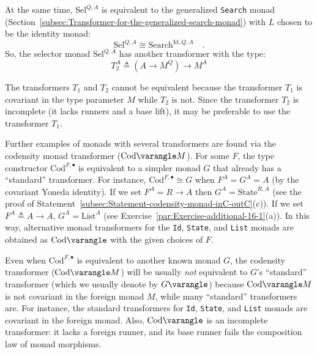 At the same time, $\text{Sel}^{Q,A}$ is equivalent to the generalized
\lstinline!Search! monad (Section~\ref{subsec:Transformer-for-the-generalized-search-monad})
with $L$ chosen to be the identity monad:
\[
\text{Sel}^{Q,A}\cong\text{Search}^{\text{Id},Q,A}\quad.
\]
So, the selector monad $\text{Sel}^{Q,A}$ has another transformer
with the type: 
\[
T_{2}^{A}\triangleq(A\rightarrow M^{Q})\rightarrow M^{A}
\]

The transformers $T_{1}$ and $T_{2}$ cannot be equivalent because
the transformer $T_{1}$ is covariant in the type parameter $M$ while
$T_{2}$ is not. Since the transformer $T_{2}$ is incomplete (it
lacks runners and a base lift), it may be preferable to use the transformer
$T_{1}$.

Further examples of monads with several transformers are found via
the codensity monad transformer ($\text{Cod}\varangle M$). For some
$F$, the type constructor $\text{Cod}^{F,\bullet}$ is equivalent
to a simpler monad $G$ that already has a \textsf{``}standard\textsf{''} transformer.
For instance, $\text{Cod}^{F,\bullet}\cong G$ when $F^{A}=G^{A}=A$
(by the covariant Yoneda identity). If we set $F^{A}=R\rightarrow A$
then $G^{A}=\text{State}^{R,A}$ (see the proof of Statement~\ref{subsec:Statement-codensity-monad-inC-outC}(c)).
If we set $F^{A}\triangleq A\rightarrow A$, $G^{A}=\text{List}^{A}$
(see Exercise~\ref{par:Exercise-additional-16-1}(a)). In this way,
alternative monad transformers for the \lstinline!Id!, \lstinline!State!,
and \lstinline!List! monads are obtained as $\text{Cod}\varangle$
with the given choices of $F$. 

Even when $\text{Cod}^{F,\bullet}$ is equivalent to another known
monad $G$, the codensity transformer ($\text{Cod}\varangle M$) will
be usually \emph{not} equivalent to $G$\textsf{'}s \textsf{``}standard\textsf{''} transformer
(which we usually denote by $G\varangle$) because $\text{Cod}\varangle M$
is not covariant in the foreign monad $M$, while many \textsf{``}standard\textsf{''}
transformers are. For instance, the standard transformers for \lstinline!Id!,
\lstinline!State!, and \lstinline!List! monads are covariant in
the foreign monad. Also, $\text{Cod}\varangle$ is an incomplete transformer:
it lacks a foreign runner, and its base runner fails the composition
law of monad morphisms.

